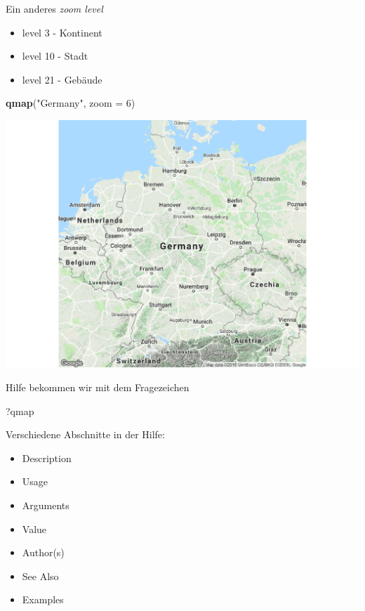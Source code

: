 \documentclass[ignorenonframetext,]{beamer}
\newenvironment{Shaded}{\begin{snugshade}}{\end{snugshade}}
\newcommand{\DataTypeTok}[1]{\textcolor[rgb]{0.13,0.29,0.53}{#1}}
\newcommand{\DecValTok}[1]{\textcolor[rgb]{0.00,0.00,0.81}{#1}}
\newcommand{\KeywordTok}[1]{\textcolor[rgb]{0.13,0.29,0.53}{\textbf{#1}}}
\newcommand{\NormalTok}[1]{#1}
\newcommand{\StringTok}[1]{\textcolor[rgb]{0.31,0.60,0.02}{#1}}
\providecommand{\tightlist}{%
  \setlength{\itemsep}{0pt}\setlength{\parskip}{0pt}}
\begin{document}
\begin{frame}[fragile]{Ein anderes \emph{zoom level}}
\protect\hypertarget{ein-anderes-zoom-level}{}

\begin{itemize}
\tightlist
\item
  level 3 - Kontinent
\item
  level 10 - Stadt
\item
  level 21 - Gebäude
\end{itemize}

\begin{Shaded}
\begin{Highlighting}[]
\KeywordTok{qmap}\NormalTok{(}\StringTok{"Germany"}\NormalTok{, }\DataTypeTok{zoom =} \DecValTok{6}\NormalTok{)}
\end{Highlighting}
\end{Shaded}

\includegraphics{ggmap_files/figure-beamer/unnamed-chunk-9-1.pdf}

\end{frame}

\begin{frame}[fragile]{Hilfe bekommen wir mit dem Fragezeichen}
\protect\hypertarget{hilfe-bekommen-wir-mit-dem-fragezeichen}{}

\begin{Shaded}
\begin{Highlighting}[]
\NormalTok{?qmap}
\end{Highlighting}
\end{Shaded}

Verschiedene Abschnitte in der Hilfe:

\begin{itemize}
\tightlist
\item
  Description
\item
  Usage
\item
  Arguments
\item
  Value
\item
  Author(s)
\item
  See Also
\item
  Examples
\end{itemize}

\end{frame}
\end{document}
